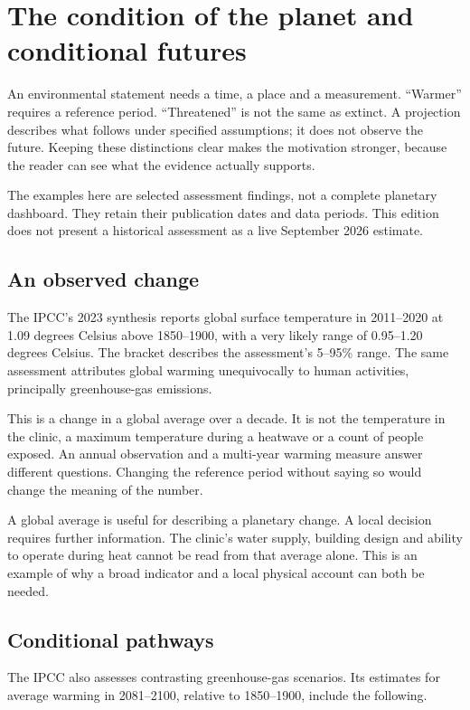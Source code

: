 \chapter{The condition of the planet and conditional futures}\label{ch:planet}

An environmental statement needs a time, a place and a measurement. ``Warmer'' requires a reference period. ``Threatened'' is not the same as extinct. A projection describes what follows under specified assumptions; it does not observe the future. Keeping these distinctions clear makes the motivation stronger, because the reader can see what the evidence actually supports.

The examples here are selected assessment findings, not a complete planetary dashboard. They retain their publication dates and data periods. This edition does not present a historical assessment as a live September 2026 estimate.

\section{An observed change}
The IPCC's 2023 synthesis reports global surface temperature in 2011--2020 at 1.09 degrees Celsius above 1850--1900, with a very likely range of 0.95--1.20 degrees Celsius. The bracket describes the assessment's 5--95\% range. The same assessment attributes global warming unequivocally to human activities, principally greenhouse-gas emissions.\cite{ipcc}

This is a change in a global average over a decade. It is not the temperature in the clinic, a maximum temperature during a heatwave or a count of people exposed. An annual observation and a multi-year warming measure answer different questions. Changing the reference period without saying so would change the meaning of the number.

A global average is useful for describing a planetary change. A local decision requires further information. The clinic's water supply, building design and ability to operate during heat cannot be read from that average alone. This is an example of why a broad indicator and a local physical account can both be needed.

\section{Conditional pathways}
The IPCC also assesses contrasting greenhouse-gas scenarios. Its estimates for average warming in 2081--2100, relative to 1850--1900, include the following.\cite{ipcc}

